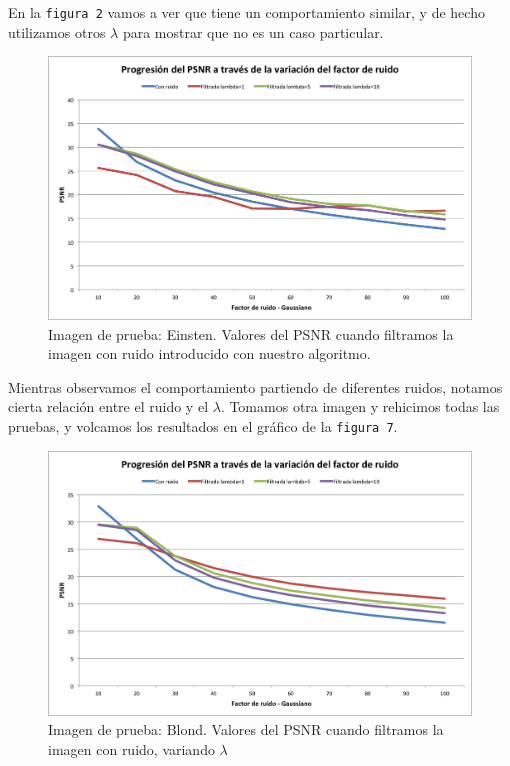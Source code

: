 \documentclass[a4paper]{article}
\begin{document}
En la \texttt{figura 2} vamos a ver que tiene un comportamiento similar, y de hecho utilizamos otros $\lambda$ para mostrar que no es un caso particular. 
\begin{figure}[H]
  \centering
  \includegraphics[scale=0.65]{graficos/PSNR_Einstein.png}
  \caption{ Imagen de prueba: Einsten. Valores del PSNR cuando filtramos la imagen con ruido introducido con nuestro algoritmo. }
\end{figure}

Mientras observamos el comportamiento partiendo de diferentes ruidos, notamos cierta relación entre el ruido y el $\lambda$.
Tomamos otra imagen y rehicimos todas las pruebas, y volcamos los resultados en el gráfico de la \texttt{figura 7}. 

\begin{figure}[H]
  \centering
  \includegraphics[scale=0.65]{graficos/PSNR_Blond.png}
  \caption{ Imagen de prueba: Blond. Valores del PSNR cuando filtramos la imagen con ruido, variando $\lambda$}
\end{figure}
\end{document}
